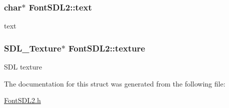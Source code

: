 \subsubsection[{\texorpdfstring{text}{text}}]{\setlength{\rightskip}{0pt plus 5cm}char$\ast$ Font\+S\+D\+L2\+::text}\hypertarget{structFontSDL2_a2ebfe0c160217282ef912e1785894c2c}{}\label{structFontSDL2_a2ebfe0c160217282ef912e1785894c2c}
text 
\subsubsection[{\texorpdfstring{texture}{texture}}]{\setlength{\rightskip}{0pt plus 5cm}S\+D\+L\+\_\+\+Texture$\ast$ Font\+S\+D\+L2\+::texture}\hypertarget{structFontSDL2_af8f18f11af2195bd21d120426ba89750}{}\label{structFontSDL2_af8f18f11af2195bd21d120426ba89750}
S\+DL texture 

The documentation for this struct was generated from the following file\+:\begin{DoxyCompactItemize}
\item 
\hyperlink{FontSDL2_8h}{Font\+S\+D\+L2.\+h}\end{DoxyCompactItemize}
